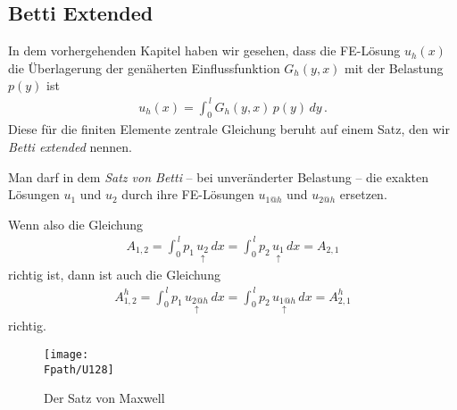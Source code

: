 \textcolor{chapterTitleBlue}{\chapter{Betti Extended}}

In dem vorhergehenden Kapitel haben wir gesehen, dass die FE-L\"{o}sung  $u_h(x)$ die \"{U}berlagerung der gen\"{a}herten Einflussfunktion $G_h(y,x)$ mit der Belastung $p(y)$ ist
\begin{align}\label{Eq96}
u_h(x) = \int_0^{\,l} G_h(y,x)\,p(y)\,dy\,.
\end{align}
Diese f\"{u}r die finiten Elemente zentrale Gleichung beruht auf einem Satz, den wir {\em Betti extended\/} nennen. \\

\begin{theorem}
Man darf in dem {\em Satz von Betti\/} -- bei unver\"{a}nderter Belastung -- die exakten L\"{o}sungen $u_1$ und $u_2$ durch ihre FE-L\"{o}sungen $u_{1@h}$ und $u_{2@h}$ ersetzen.
\end{theorem}

Wenn also die Gleichung
\begin{align}
A_{1,2} = \int_0^{\,l} p_1\,\underset{\uparrow}{u_2}\,dx = \int_0^{\,l} p_2\,\underset{\uparrow}{u_1}\,dx = A_{2,1}
\end{align}
richtig ist, dann ist auch die Gleichung
\begin{align}
A_{1,2}^h  = \int_0^{\,l} p_1\,\underset{\uparrow}{u_{2@h}}\,dx = \int_0^{\,l} p_2\,\underset{\uparrow}{u_{1@h}}\,dx= A_{2,1}^h
\end{align}
richtig.

\begin{figure}[tbp]
\centering
\if {} \sidecaption \fi
\texttt{[image: \\Fpath/U128]}
\caption{Der Satz von Maxwell} \label{U128}
\end{figure}%

